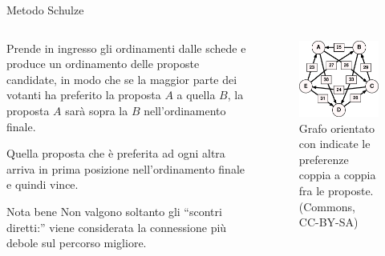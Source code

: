 \begin{frame}{Metodo Schulze}
\begin{columns}
\begin{column}{.666\textwidth}
Prende in ingresso gli ordinamenti dalle schede e produce un ordinamento delle proposte candidate, in modo che se la maggior parte dei votanti ha preferito la proposta $A$ a quella $B$, la proposta $A$ sarà sopra la $B$ nell'ordinamento finale.

\alert{Quella proposta che è preferita ad ogni altra arriva in prima posizione  nell'ordinamento finale e quindi vince}.

\begin{block}{Nota bene}
Non valgono soltanto gli ``scontri diretti:'' viene considerata la connessione più debole sul percorso migliore.
\end{block}
\end{column}
\begin{column}{.333\textwidth}
\begin{figure}[p]
\centering\includegraphics[width=\textwidth]{pics/Schulze_method_example1}
\caption{Grafo orientato con indicate le preferenze coppia a coppia fra le proposte. (Commons, CC-BY-SA)}
\end{figure}
\end{column}
\end{columns}
\end{frame}

